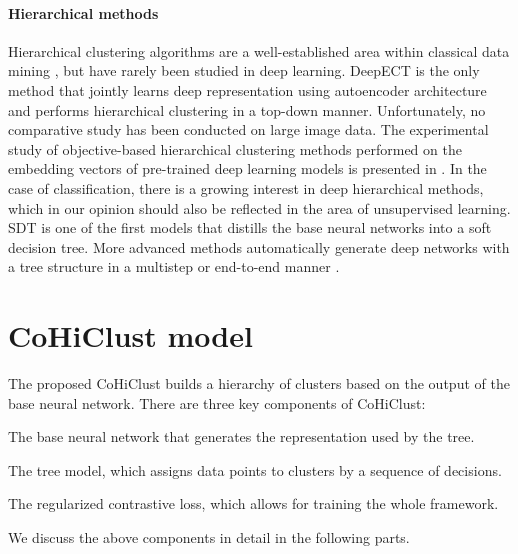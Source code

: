 \documentclass[runningheads]{llncs}
\def\our{CoHiClust}
\begin{document}
\paragraph{Hierarchical methods} 

Hierarchical clustering algorithms are a well-established area within classical data mining \cite{Murtagh}, but have rarely been studied in deep learning. DeepECT \cite{mautz2019deep,mautz2020deepect} is the only method that jointly learns deep representation using autoencoder architecture and performs hierarchical clustering in a top-down manner. Unfortunately, no comparative study has been conducted on large image data. The experimental study of objective-based hierarchical clustering methods performed on the embedding vectors of pre-trained deep learning models is presented in \cite{naumov2021objective}. In the case of classification, there is a growing interest in deep hierarchical methods, which in our opinion should also be reflected in the area of unsupervised learning. SDT \cite{frosst2017distilling} is one of the first models that distills the base neural networks into a soft decision tree. More advanced methods automatically generate deep networks with a tree structure in a multistep or end-to-end manner \cite{tanno2019adaptive,alaniz2021learning,wan2020nbdt}.















\section{\our{} model}

The proposed \our{} builds a hierarchy of clusters based on the output of the base neural network. There are three key components of \our{}:
\begin{compactitem}
    \item The base neural network that generates the representation used by the tree.
    \item The tree model, which assigns data points to clusters by a sequence of decisions.
    \item The regularized contrastive loss, which allows for training the whole framework. 
\end{compactitem}
We discuss the above components in detail in the following parts.
\end{document}
